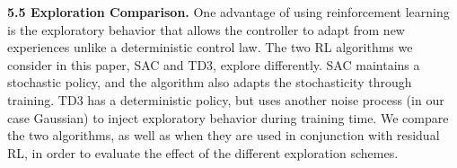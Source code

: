 \textbf{5.5 Exploration Comparison.} One advantage of using reinforcement learning is the exploratory behavior that allows the controller to adapt from new experiences unlike a deterministic control law.
The two RL algorithms we consider in this paper, SAC and TD3, explore differently. SAC maintains a stochastic policy, and the algorithm also adapts the stochasticity through training. TD3 has a deterministic policy, but uses another noise process (in our case Gaussian) to inject exploratory behavior during training time.
We compare the two algorithms, as well as when they are used in conjunction with residual RL, in order to evaluate the effect of the different exploration schemes.


